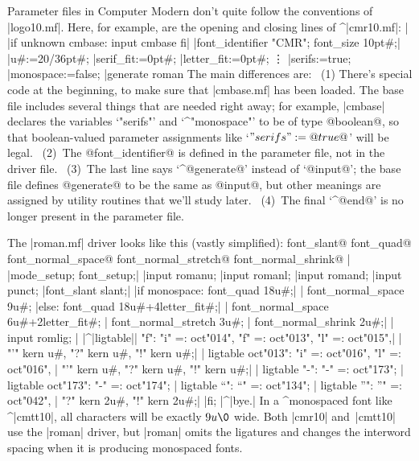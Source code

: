 Parameter files in Computer Modern don't quite follow the conventions
of\/ |logo10.mf|. Here, for example, are the
opening and closing lines of ^|cmr10.mf|:
\beginlines
|%
|if unknown cmbase: input cmbase fi|
\smallskip
|font_identifier "CMR"; font_size 10pt#;|
\smallskip
|u#:=20/36pt#;                %
|serif_fit:=0pt#;             %
|letter_fit:=0pt#;            %
\vskip-3pt
\qquad\vdots
|serifs:=true;                %
|monospace:=false;            %
\smallskip
|generate roman               %
\endlines
The main differences are: \ (1) There's special code at the beginning, to
make sure that |cmbase.mf| has been loaded. The base file includes
several things that are needed right away; for example, |cmbase| declares
the variables `"serifs"' and `^"monospace"' to be of type @boolean@,
so that boolean-valued parameter assignments like `$"serifs":=@true@$'
will be legal. \ (2)~The @font\_identifier@ is defined in the parameter file,
not in the driver file. \ (3)~The last line says `^@generate@' instead of
`@input@'; the base file defines @generate@ to be the same as @input@,
but other meanings are assigned by utility routines that we'll study later.
\ (4)~The final `^@end@' is no longer present in the parameter file.

The |roman.mf| driver looks like this (vastly simplified):
^^@font\_slant@ ^^@font\_quad@ ^^@font\_normal\_space@
^^@font\_normal\_stretch@ ^^@font\_normal\_shrink@
\beginlines
|%
\smallskip
|mode_setup; font_setup;|
\smallskip
|input romanu;                         %
|input romanl;                         %
|input romand;                         %
|input punct;                          %
\smallskip
|font_slant slant;|
|if monospace: font_quad 18u#;|
| font_normal_space 9u#;               %
|else: font_quad 18u#+4letter_fit#;|
| font_normal_space 6u#+2letter_fit#;  %
| font_normal_stretch 3u#;             %
| font_normal_shrink 2u#;|
| input romlig;                        %
| |^|ligtable|| "f": "i" =: oct"014", "f" =: oct"013", "l" =: oct"015",|
|            "'" kern u#, "?" kern u#, "!" kern u#;|
| ligtable oct"013": "i" =: oct"016", "l" =: oct"016",   %
|            "'" kern u#, "?" kern u#, "!" kern u#;|
| ligtable "-": "-" =: oct"173";                         %
| ligtable oct"173": "-" =: oct"174";                    %
| ligtable "`": "`" =: oct"134";                         %
| ligtable "'": "'" =: oct"042",                         %
|            "?" kern 2u#, "!" kern 2u#;|
|fi; |^|bye.|
\endlines
In a ^{monospaced} font like ^|cmtt10|, all characters will be exactly
$9u\0$ wide. Both |cmr10| and~|cmtt10| use the |roman| driver, but
|roman| omits the ligatures and changes the interword spacing
when it is producing monospaced fonts.

